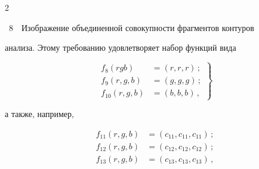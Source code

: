 \begin{multicols}{2}
\begin{center}
{\epsfxsize=78mm


}

\end{center}

  \vspace*{2pt}



\noindent

{{\figurename~8}\ \ \small{Изображение объединенной совокупности фрагментов контуров}}






\addtocounter{figure}{1}





\noindent

анализа. Этому требованию удовлетворяет набор функций вида

  \begin{equation}

  \left.

  \begin{array}{rl}

  f_8 (rgb) &=(r,r,r)\,;\\[6pt]

  f_9(r,g,b) &= (g,g,g)\,;\\[6pt]

  f_{10}(r,g,b) &= (b,b,b)\,,

  \end{array}

  \right\}

  \label{e2-zyk}

  \end{equation}

а также, например,

\noindent

\begin{equation}

\left.

\begin{array}{rl}

f_{11}(r,g,b) &=(c_{11}, c_{11}, c_{11})\,; \\[6pt]

f_{12}(r,g,b) &=(c_{12}, c_{12}, c_{12})\,; \\[6pt]

f_{13}(r,g,b) &=(c_{13}, c_{13}, c_{13})\,,


\end{array}
\end{equation}
\end{multicols}
